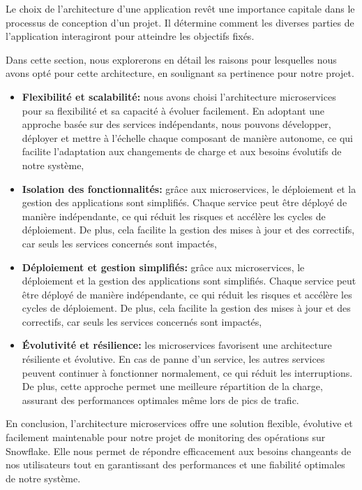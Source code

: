 \par Le choix de l'architecture d'une application revêt une importance capitale dans le processus de conception d'un projet. 
Il détermine comment les diverses parties de l'application interagiront pour atteindre les objectifs fixés.
\par Dans cette section, nous explorerons en détail les raisons pour lesquelles nous avons opté pour cette architecture, en soulignant sa pertinence pour notre projet.
\begin{itemize}
        \item \textbf{Flexibilité et scalabilité: } nous avons choisi l'architecture microservices pour sa flexibilité et sa capacité à évoluer facilement. 
        En adoptant une approche basée sur des services indépendants, nous pouvons développer, déployer et mettre à l'échelle chaque composant de manière autonome, 
        ce qui facilite l'adaptation aux changements de charge et aux besoins évolutifs de notre système,
        \item \textbf{Isolation des fonctionnalités: } grâce aux microservices, le déploiement et la gestion des applications sont simplifiés. Chaque service peut être déployé de manière indépendante, ce qui réduit les risques et accélère les cycles de déploiement.
         De plus, cela facilite la gestion des mises à jour et des correctifs, car seuls les services concernés sont impactés,
        \item \textbf{Déploiement et gestion simplifiés:} grâce aux microservices, le déploiement et la gestion des applications sont simplifiés. Chaque service peut être déployé de manière indépendante, ce qui réduit les risques et accélère les cycles de déploiement.
         De plus, cela facilite la gestion des mises à jour et des correctifs, car seuls les services concernés sont impactés,
         \item \textbf{Évolutivité et résilience:} les microservices favorisent une architecture résiliente et évolutive. 
         En cas de panne d'un service, les autres services peuvent continuer à fonctionner normalement, ce qui réduit les interruptions.
         De plus, cette approche permet une meilleure répartition de la charge, assurant des performances optimales même lors de pics de trafic.
\end{itemize}
\par En conclusion, l'architecture microservices offre une solution flexible, évolutive et facilement maintenable pour notre projet de monitoring des opérations sur Snowflake.
Elle nous permet de répondre efficacement aux besoins changeants de nos utilisateurs tout en garantissant des performances et une fiabilité optimales de notre système.
